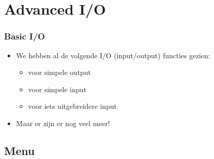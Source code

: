 \section{Advanced I/O}

\begin{frame}
\frametitle{Basic I/O}

\begin{itemize}
  \item<1-> We hebben al de volgende I/O (input/output) functies gezien:
  \begin{itemize}
    \item<2->  voor simpele output
    \item<3->  voor simpele input
    \item<4->  voor iets uitgebreidere input
  \end{itemize}
  \item<5-> Maar er zijn er nog veel meer!
\end{itemize}

\end{frame}

\subsection{Menu}

